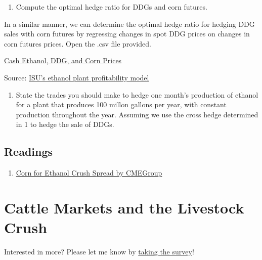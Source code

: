 \documentclass[
  letterpaper,
  DIV=11,
  numbers=noendperiod]{scrreprt}
\providecommand{\tightlist}{%
  \setlength{\itemsep}{0pt}\setlength{\parskip}{0pt}}\usepackage{longtable,booktabs,array}
\begin{document}
\begin{enumerate}
\def\labelenumi{\arabic{enumi}.}
\tightlist
\item
  Compute the optimal hedge ratio for DDGs and corn futures.
\end{enumerate}

In a similar manner, we can determine the optimal hedge ratio for
hedging DDG sales with corn futures by regressing changes in spot DDG
prices on changes in corn futures prices. Open the .csv file provided.

\href{http://mindymallory.github.io/PriceAnalysis/Excel-files/Ethanol-Prices.csv}{Cash
Ethanol, DDG, and Corn Prices}

Source:
\href{https://www.extension.iastate.edu/agdm/articles/hof/HofJan08.html}{ISU's
ethanol plant profitability model}

\begin{enumerate}
\def\labelenumi{\arabic{enumi}.}
\setcounter{enumi}{1}
\tightlist
\item
  State the trades you should make to hedge one month's production of
  ethanol for a plant that produces 100 millon gallons per year, with
  constant production throughout the year. Assuming we use the cross
  hedge determined in 1 to hedge the sale of DDGs.
\end{enumerate}

\hypertarget{readings-5}{%
\section{Readings}\label{readings-5}}

\begin{enumerate}
\def\labelenumi{\arabic{enumi}.}
\tightlist
\item
  \href{http://www.cmegroup.com/trading/agricultural/files/AC-406_DDG_CornCrush_042010.pdf}{Corn
  for Ethanol Crush Spread by CMEGroup}
\end{enumerate}


\hypertarget{cattle-markets-and-the-livestock-crush}{%
\chapter{Cattle Markets and the Livestock
Crush}\label{cattle-markets-and-the-livestock-crush}}

{Interested in more? Please let me know by}
\href{https://forms.gle/Q3VByCQZHjfQSy9D7}{taking the survey}!
\end{document}
